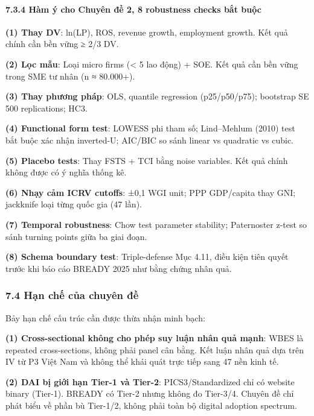 \documentclass[12pt,a4paper]{article}
\begin{document}
\hypertarget{734-huxe0m-uxfd-cho-chuyuxean-ux111ux1ec1-2-8-robustness-checks-bux1eaft-buux1ed9c}{%
\paragraph{7.3.4 Hàm ý cho Chuyên đề 2, 8 robustness checks bắt
buộc}\label{734-huxe0m-uxfd-cho-chuyuxean-ux111ux1ec1-2-8-robustness-checks-bux1eaft-buux1ed9c}}

\textbf{(1) Thay DV}: ln(LP), ROS, revenue growth, employment growth.
Kết quả chính cần bền vững ≥ 2/3 DV.

\textbf{(2) Lọc mẫu}: Loại micro firms (\textless{} 5 lao động) + SOE.
Kết quả cần bền vững trong SME tư nhân (n ≈ 80.000+).

\textbf{(3) Thay phương pháp}: OLS, quantile regression (p25/p50/p75);
bootstrap SE 500 replications; HC3.

\textbf{(4) Functional form test}: LOWESS phi tham số; Lind--Mehlum
(2010) test bắt buộc xác nhận inverted-U; AIC/BIC so sánh linear vs
quadratic vs cubic.

\textbf{(5) Placebo tests}: Thay FSTS + TCI bằng noise variables. Kết
quả chính không được có ý nghĩa thống kê.

\textbf{(6) Nhạy cảm ICRV cutoffs}: ±0,1 WGI unit; PPP GDP/capita thay
GNI; jackknife loại từng quốc gia (47 lần).

\textbf{(7) Temporal robustness}: Chow test parameter stability;
Paternoster z-test so sánh turning points giữa ba giai đoạn.

\textbf{(8) Schema boundary test}: Triple-defense Mục 4.11, điều kiện
tiên quyết trước khi báo cáo BREADY 2025 như bằng chứng nhân quả.

\hypertarget{74-hux1ea1n-chux1ebf-cux1ee7a-chuyuxean-ux111ux1ec1}{%
\subsubsection{7.4 Hạn chế của chuyên
đề}\label{74-hux1ea1n-chux1ebf-cux1ee7a-chuyuxean-ux111ux1ec1}}

Bảy hạn chế cấu trúc cần được thừa nhận minh bạch:

\textbf{(1) Cross-sectional không cho phép suy luận nhân quả mạnh}: WBES
là repeated cross-sections, không phải panel cân bằng. Kết luận nhân quả
dựa trên IV từ P3 Việt Nam và không thể khái quát trực tiếp sang 47 nền
kinh tế.

\textbf{(2) DAI bị giới hạn Tier-1 và Tier-2}: PICS3/Standardized chỉ có
website binary (Tier-1). BREADY có Tier-2 nhưng không đo Tier-3/4.
Chuyên đề chỉ phát biểu về phần bù Tier-1/2, không phải toàn bộ digital
adoption spectrum.
\end{document}
